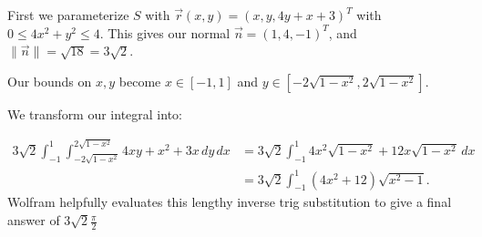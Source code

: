 \documentclass{article}
\begin{document}
\begin{enumerate}
First we parameterize $S$ with $\vec{r}(x,y)=(x,y,4y+x+3)^{T}$ with $0\le 4x^2+y^2\le 4$.
This gives our normal $\vec{n}=(1,4,-1)^{T}$, and $\|\vec{n}\|=\sqrt{18} =3\sqrt{2} $.

Our bounds on $x,y$ become $x\in [-1,1]$ and $y\in [-2\sqrt{1-x^2}  ,2\sqrt{1-x^2} ]$.

We transform our integral into:

\begin{align*}
    3\sqrt{2} \int_{-1}^1\int_{-2\sqrt{1-x^2} }^{2\sqrt{1-x^2} }4xy+x^2+3x\,dy\,dx&=
    3\sqrt{2} \int_{-1}^{1}4x^2\sqrt{1-x^2} +12x\sqrt{1-x^2} \,dx\\
    &= 3\sqrt{2} \int_{-1}^{1}(4x^2+12)\sqrt{x^2-1}
.\end{align*}
Wolfram helpfully evaluates this lengthy inverse trig substitution to give a final answer of $3\sqrt{2} \frac{\pi}{2}$
\end{enumerate}
\end{document}
